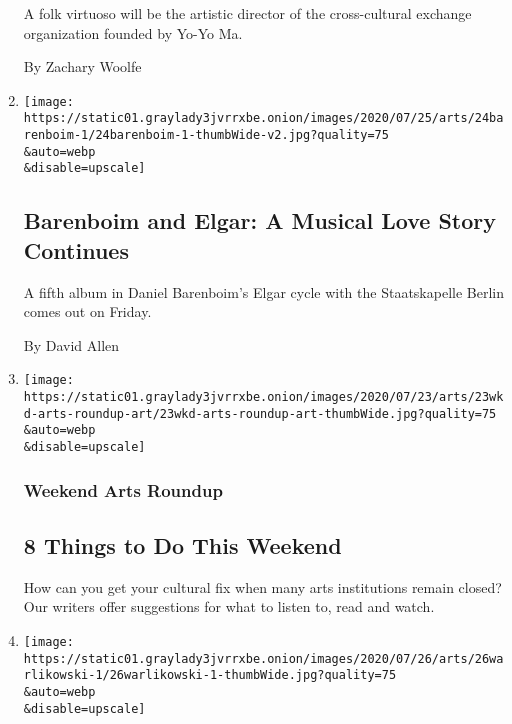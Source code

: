 \begin{enumerate}
  A folk virtuoso will be the artistic director of the cross-cultural
  exchange organization founded by Yo-Yo Ma.

  By Zachary Woolfe
\item
  \href{/2020/07/24/arts/music/barenboim-elgar.html}{}

  \texttt{[image: https://static01.graylady3jvrrxbe.onion/images/2020/07/25/arts/24barenboim-1/24barenboim-1-thumbWide-v2.jpg?quality=75\\\&auto=webp\\\&disable=upscale]}

  \hypertarget{barenboim-and-elgar-a-musical-love-story-continues}{%
  \subsection{Barenboim and Elgar: A Musical Love Story
  Continues}\label{barenboim-and-elgar-a-musical-love-story-continues}}

  A fifth album in Daniel Barenboim's Elgar cycle with the Staatskapelle
  Berlin comes out on Friday.

  By David Allen
\item
  \href{/2020/07/23/arts/things-to-do-weekend-coronavirus.html}{}

  \texttt{[image: https://static01.graylady3jvrrxbe.onion/images/2020/07/23/arts/23wkd-arts-roundup-art/23wkd-arts-roundup-art-thumbWide.jpg?quality=75\\\&auto=webp\\\&disable=upscale]}

  \hypertarget{weekend-arts-roundup}{%
  \subsubsection{Weekend Arts Roundup}\label{weekend-arts-roundup}}

  \hypertarget{8-things-to-do-this-weekend}{%
  \subsection{8 Things to Do This
  Weekend}\label{8-things-to-do-this-weekend}}

  How can you get your cultural fix when many arts institutions remain
  closed? Our writers offer suggestions for what to listen to, read and
  watch.
\item
  \href{/2020/07/22/arts/music/krzysztof-warlikowski.html}{}

  \texttt{[image: https://static01.graylady3jvrrxbe.onion/images/2020/07/26/arts/26warlikowski-1/26warlikowski-1-thumbWide.jpg?quality=75\\\&auto=webp\\\&disable=upscale]}


\end{enumerate}
